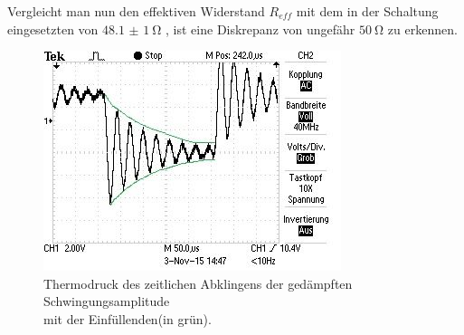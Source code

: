 \documentclass{scrartcl}
\begin{document}
     Vergleicht man nun den effektiven Widerstand $R_{eff}$ mit dem in der Schaltung eingesetzten von $\SI{48,1(1)}{\ohm}$ , ist eine Diskrepanz von ungefähr $\SI{50}{\ohm}$ zu erkennen.
     \begin{figure}
     \centering
     \includegraphics{Thermo.jpg}
     \caption{Thermodruck des zeitlichen Abklingens der gedämpften Schwingungsamplitude\\ mit der Einfüllenden(in grün).}
     \label{fig:thermodruck}
     \end{figure}
     \newpage
\end{document}
